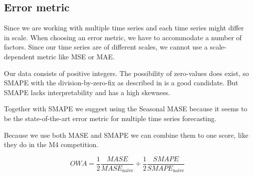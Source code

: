 \subsection{Error metric}
Since we are working with multiple time series and each time series might differ in scale.
When choosing an error metric, we have to accommodate a number of factors.
Since our time series are of different scales, we cannot use a scale-dependent metric
like MSE or MAE.

Our data consists of positive integers. The possibility of zero-values does exist,
so SMAPE with the division-by-zero-fix as described in  is a good candidate.
But SMAPE lacks interpretability and has a high skewness.

Together with SMAPE we suggest using the Seasonal MASE because it seems to be the
state-of-the-art error metric for multiple time series forecasting.

Because we use both MASE and SMAPE we can combine them to one score, like
they do in the M4 competition.

\begin{equation}
  \label{eq:OWA}
  OWA = \frac{1}{2} \frac{MASE}{MASE_{\text{naive}}} + \frac{1}{2} \frac{SMAPE}{SMAPE_{\text{naive}}}
\end{equation}
